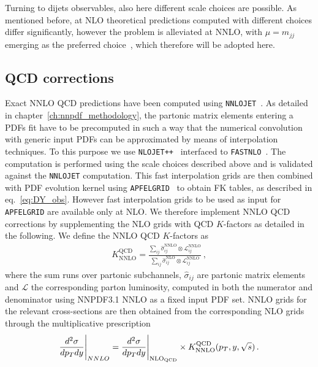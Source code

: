 %
Turning to dijets observables, also here different scale choices are possible. As mentioned before, at NLO theoretical predictions
computed with different choices differ significantly, however the problem is alleviated at NNLO, with $\mu = m_{jj}$
emerging as the preferred choice~\cite{Currie:2017eqf,Currie:2018oxh}, which therefore will be adopted here. 

\subsection{QCD corrections}
Exact NNLO QCD predictions have been computed using {\tt NNLOJET}~\cite{Gehrmann-DeRidder:2019ibf}. 
As detailed in chapter~\ref{ch:nnpdf_methodology}, the partonic matrix elements entering a PDFs fit
have to be precomputed in such a way that the numerical convolution with generic input PDFs can be approximated by means
of interpolation techniques. 
To this purpose we use {\tt NLOJET++}~\cite{Nagy:2001fj} interfaced to {\tt F{\small AST}NLO}~\cite{Wobisch:2011ij}.
The computation is performed using the scale choices described above and is validated against the {\tt NNLOJET} computation.
This fast interpolation grids are then combined with PDF evolution kernel using {\tt APFEL{\small GRID}}~\cite{Bertone:2016lga}
to obtain FK tables, as described in eq.~\eqref{eq:DY_obs}.
However fast interpolation grids to be used as input for {\tt APFEL{\small GRID}} are available only at NLO.
We therefore implement NNLO QCD corrections by supplementing the NLO grids with QCD $K$-factors as detailed in the following.
We define the NNLO QCD $K$-factors as
\begin{align}
    \label{eq:QCD_kfactors}
    K^{\text{QCD}}_{\text{NNLO}} = \frac{\sum_{ij}\hat{\sigma}_{ij}^{\text{NNLO}}\otimes \mathcal{L}_{ij}^{\text{NNLO}}}
    {\sum_{ij}\hat{\sigma}_{ij}^{\text{NLO}}\otimes \mathcal{L}_{ij}^{\text{NNLO}}}\,,
\end{align}
where the sum runs over partonic subchannels, $\hat{\sigma}_{ij}$ are partonic matrix elements and $\mathcal{L}$
the corresponding parton luminosity, computed in both the numerator and denominator using NNPDF3.1 NNLO as a fixed input 
PDF set.
NNLO grids for the relevant cross-sections are then obtained from the corresponding NLO grids through the multiplicative
prescription
\begin{align}
    \label{eq:NNLO_kfactors}
    \frac{d^2\sigma}{dp_T dy}\Bigg|_{NNLO} = \frac{d^2\sigma}{dp_T dy}
    \Bigg|_{\rm NLO_{QCD}} \times K_{\rm NNLO}^{\rm QCD}(p_T,y,\sqrt{s})\, .
\end{align}
